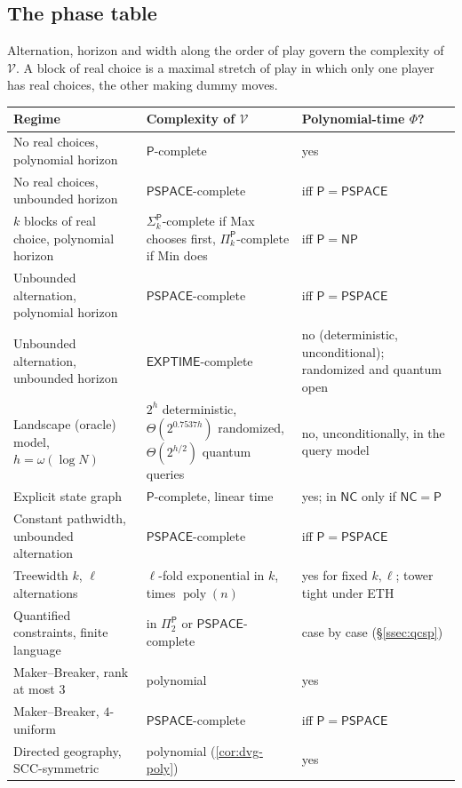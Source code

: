 \documentclass[final]{siamart0516}
\numberwithin{theorem}{section}
\numberwithin{equation}{section}
\theoremstyle{siamnonum}
\theoremstyle{plain}
\newcommand{\val}{\mathcal{V}}            %
\newcommand{\poly}{\operatorname{poly}}
\newcommand{\cls}[1]{\mathsf{#1}}
\newcommand{\PSPACE}{\cls{PSPACE}}
\newcommand{\EXPTIME}{\cls{EXPTIME}}
\newcommand{\NP}{\cls{NP}}
\newcommand{\Pclass}{\cls{P}}
\newcommand{\NC}{\cls{NC}}
\begin{document}
\subsection{The phase table}\label{ssec:phase}
Alternation, horizon and width along the order of play govern the complexity of $\val$. A block of real choice is a maximal stretch of play in which only one player has real choices, the other making dummy moves.

\begin{center}
\small
\begin{longtable}{@{}L{0.36}L{0.32}L{0.25}@{}}
\toprule
Regime & Complexity of $\val$ & Polynomial-time $\Phi$?\\ \midrule\endhead
No real choices, polynomial horizon & $\Pclass$-complete & yes\\
No real choices, unbounded horizon & $\PSPACE$-complete & iff $\Pclass=\PSPACE$\\
$k$ blocks of real choice, polynomial horizon & $\Sigma_k^{\Pclass}$-complete if Max chooses first, $\Pi_k^{\Pclass}$-complete if Min does & iff $\Pclass=\NP$\\
Unbounded alternation, polynomial horizon & $\PSPACE$-complete & iff $\Pclass=\PSPACE$\\
Unbounded alternation, unbounded horizon & $\EXPTIME$-complete & no (deterministic, unconditional); randomized and quantum open\\
Landscape (oracle) model, $h=\omega(\log N)$ & $2^h$ deterministic, $\Theta(2^{0.7537h})$ randomized, $\Theta(2^{h/2})$ quantum queries & no, unconditionally, in the query model\\
Explicit state graph & $\Pclass$-complete, linear time & yes; in $\NC$ only if $\NC=\Pclass$\\
Constant pathwidth, unbounded alternation & $\PSPACE$-complete & iff $\Pclass=\PSPACE$\\
Treewidth $k$, $\ell$ alternations & $\ell$-fold exponential in $k$, times $\poly(n)$ & yes for fixed $k,\ell$; tower tight under ETH\\
Quantified constraints, finite language & in $\Pi_2^{\Pclass}$ or $\PSPACE$-complete & case by case (\S\ref{ssec:qcsp})\\
Maker--Breaker, rank at most $3$ & polynomial & yes\\
Maker--Breaker, $4$-uniform & $\PSPACE$-complete & iff $\Pclass=\PSPACE$\\
Directed geography, SCC-symmetric & polynomial (\cref{cor:dvg-poly}) & yes\\

\end{longtable}
\end{center}
\end{document}
